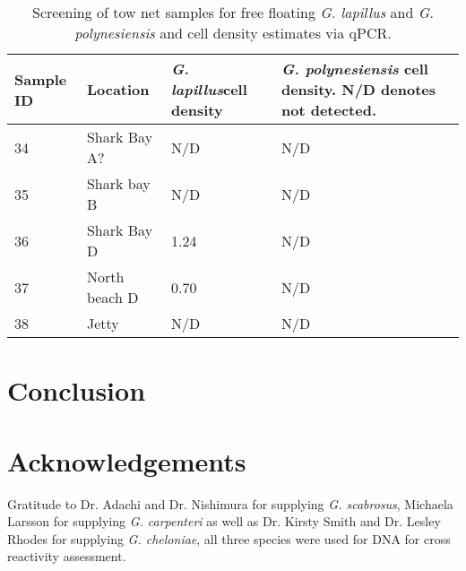 \documentclass[12pt]{article}
\begin{document}
\begin{table}
\caption{Screening of tow net samples for free floating \emph{G. lapillus} and \emph{G. polynesiensis} and cell density estimates via qPCR.}
\label{tbl:NetTable}
\begin{tabular}{ | p{4cm} | p{4cm} |p{4cm} | p{4cm} | }
\hline
\textbf{Sample ID}&\textbf{Location}&\textbf{\emph{G. lapillus}cell density}&\textbf{\emph{G. polynesiensis} cell density. N/D denotes not detected.}\\
\hline
34&Shark Bay A?&N/D&N/D\\
\hline
35&Shark bay B&N/D&N/D\\
\hline
36&Shark Bay D&1.24
&N/D\\
\hline
37&North beach D&0.70
&N/D\\
\hline
38&Jetty&N/D
&N/D\\
\hline
\end{tabular}
\end{table}
\FloatBarrier
\newpage
\section{Conclusion}
\section{Acknowledgements}
Gratitude to Dr. Adachi and Dr. Nishimura for supplying \emph{G. scabrosus}, Michaela Larsson for supplying \emph{G. carpenteri} as well as Dr. Kirsty Smith and Dr. Lesley Rhodes for supplying \emph{G. cheloniae}, all three species were used for DNA for cross reactivity assessment. 
\FloatBarrier
\newpage


\end{document}
